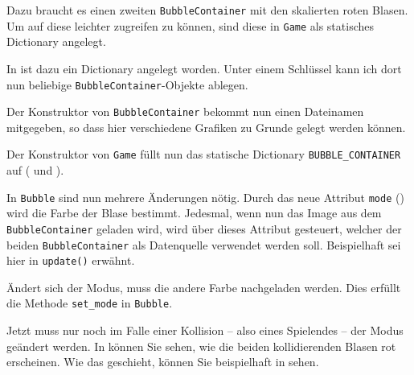 Dazu braucht es einen zweiten \texttt{BubbleContainer} mit den skalierten roten Blasen. Um auf diese leichter zugreifen zu können, sind diese in \texttt{Game} als statisches Dictionary angelegt. 

In  ist dazu ein Dictionary angelegt worden. Unter einem Schlüssel kann ich dort nun beliebige \texttt{BubbleContainer}-Objekte ablegen.


Der Konstruktor von \texttt{BubbleContainer} bekommt nun einen Dateinamen mitgegeben, so dass hier verschiedene Grafiken zu Grunde gelegt werden können.


Der Konstruktor von \texttt{Game} füllt nun das statische Dictionary \texttt{BUBBLE\_CONTAINER} auf ( und ).


In \texttt{Bubble} sind nun mehrere Änderungen nötig. Durch das neue Attribut \texttt{mode} () wird die Farbe der Blase bestimmt. Jedesmal, wenn nun das Image aus dem \texttt{Bubble\-Con\-tainer} geladen wird, wird über dieses Attribut gesteuert, welcher der beiden \texttt{Bubble\-Con\-tainer} als Datenquelle verwendet werden soll. Beispielhaft sei hier  in \texttt{update()} erwähnt.


Ändert sich der Modus, muss die andere Farbe nachgeladen werden. Dies erfüllt die Methode \texttt{set\_mode} in \texttt{Bubble}.


Jetzt muss nur noch im Falle einer Kollision -- also eines Spielendes -- der Modus geändert werden. In  können Sie sehen, wie die beiden kollidierenden Blasen rot erscheinen. Wie das geschieht, können Sie beispielhaft in  sehen.

